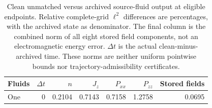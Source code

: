 \begin{table}[tbp]
\centering\small
\caption{Clean unmatched versus archived source-fluid output at eligible endpoints. Relative complete-grid $\ell^2$ differences are percentages, with the archived state as denominator. The final column is the combined norm of all eight stored field components, not an electromagnetic energy error. $\Delta t$ is the actual clean-minus-archived time. These norms are neither uniform pointwise bounds nor trajectory-admissibility certificates.}
\label{tab:baseline-fidelity}
\begin{tabular}{lrrrrrr}
\toprule
Fluids & $\Delta t$ & $n$ & $J_z$ & $P_{xx}$ & $P_{zz}$ & Stored fields \\
\midrule
One & 0 & 0.2104 & 0.7143 & 0.7158 & 1.2758 & 0.0695 \\
\bottomrule
\end{tabular}
\end{table}
